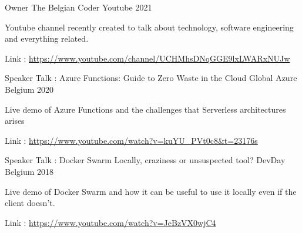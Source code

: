 

\begin{cventries}

\cventry
{Owner}
{The Belgian Coder}
{Youtube}
{2021}
{
  \begin{cvitems}
    \item Youtube channel recently created to talk about technology, software engineering and everything related.
    \item Link : \url{https://www.youtube.com/channel/UCHMhsDNqGGE9lxLWARxNUJw}
  \end{cvitems}
}

\cventry
{Speaker} %
{Talk : Azure Functions: Guide to Zero Waste in the Cloud } %
{Global Azure Belgium} %
{2020} %
{
  \begin{cvitems}
    \item Live demo of Azure Functions and the challenges that Serverless architectures arises
    \item Link : \url{https://www.youtube.com/watch?v=kuYU_PVt0c8&t=23176s}
  \end{cvitems}
}

\cventry
{Speaker} %
{Talk : Docker Swarm Locally, craziness or unsuspected tool? } %
{DevDay Belgium} %
{2018} %
{
  \begin{cvitems}
    \item Live demo of Docker Swarm and how it can be useful to use it locally even if the client doesn't. 
    \item Link : \url{https://www.youtube.com/watch?v=JeBzVX0wjC4}
  \end{cvitems}
}


\end{cventries}
